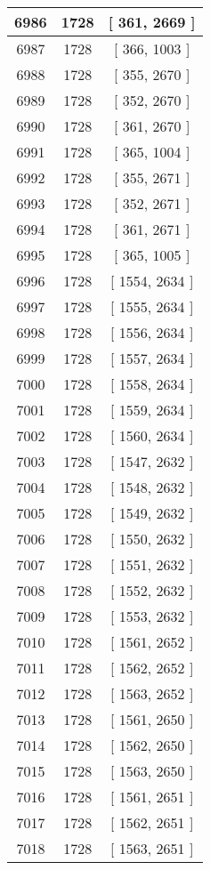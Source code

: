 \begin{center}
\begin{longtable}[H]{|| c c c ||}
\hline
6986 & 1728 & [ 361, 2669 ] \\ 
\hline
6987 & 1728 & [ 366, 1003 ] \\ 
\hline
6988 & 1728 & [ 355, 2670 ] \\ 
\hline
6989 & 1728 & [ 352, 2670 ] \\ 
\hline
6990 & 1728 & [ 361, 2670 ] \\ 
\hline
6991 & 1728 & [ 365, 1004 ] \\ 
\hline
6992 & 1728 & [ 355, 2671 ] \\ 
\hline
6993 & 1728 & [ 352, 2671 ] \\ 
\hline
6994 & 1728 & [ 361, 2671 ] \\ 
\hline
6995 & 1728 & [ 365, 1005 ] \\ 
\hline
6996 & 1728 & [ 1554, 2634 ] \\ 
\hline
6997 & 1728 & [ 1555, 2634 ] \\ 
\hline
6998 & 1728 & [ 1556, 2634 ] \\ 
\hline
6999 & 1728 & [ 1557, 2634 ] \\ 
\hline
7000 & 1728 & [ 1558, 2634 ] \\ 
\hline
7001 & 1728 & [ 1559, 2634 ] \\ 
\hline
7002 & 1728 & [ 1560, 2634 ] \\ 
\hline
7003 & 1728 & [ 1547, 2632 ] \\ 
\hline
7004 & 1728 & [ 1548, 2632 ] \\ 
\hline
7005 & 1728 & [ 1549, 2632 ] \\ 
\hline
7006 & 1728 & [ 1550, 2632 ] \\ 
\hline
7007 & 1728 & [ 1551, 2632 ] \\ 
\hline
7008 & 1728 & [ 1552, 2632 ] \\ 
\hline
7009 & 1728 & [ 1553, 2632 ] \\ 
\hline
7010 & 1728 & [ 1561, 2652 ] \\ 
\hline
7011 & 1728 & [ 1562, 2652 ] \\ 
\hline
7012 & 1728 & [ 1563, 2652 ] \\ 
\hline
7013 & 1728 & [ 1561, 2650 ] \\ 
\hline
7014 & 1728 & [ 1562, 2650 ] \\ 
\hline
7015 & 1728 & [ 1563, 2650 ] \\ 
\hline
7016 & 1728 & [ 1561, 2651 ] \\ 
\hline
7017 & 1728 & [ 1562, 2651 ] \\ 
\hline
7018 & 1728 & [ 1563, 2651 ] \\ 

\end{longtable}
\end{center}
